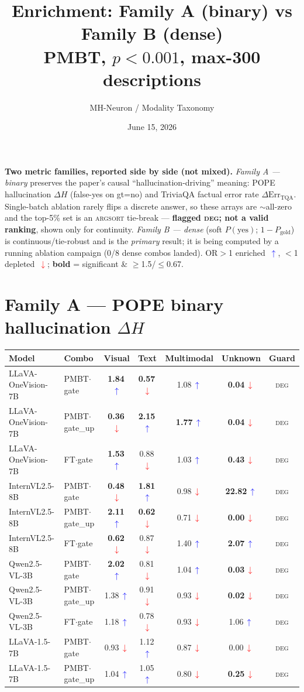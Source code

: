 \documentclass[11pt,a4paper]{article}
\title{Enrichment: Family A (binary) vs Family B (dense)\\[0.3em]
\large PMBT, $p<0.001$, max-300 descriptions}
\author{MH-Neuron / Modality Taxonomy}\date{June 15, 2026}
\newcommand{\up}{\,\textcolor{blue}{$\uparrow$}}\newcommand{\dn}{\,\textcolor{red}{$\downarrow$}}
\begin{document}
\maketitle

\noindent\textbf{Two metric families, reported side by side (not mixed).}
\emph{Family A — binary} preserves the paper's causal ``hallucination-driving''
meaning: POPE hallucination $\Delta H$ (false-yes on gt=no) and TriviaQA factual
error rate $\Delta\mathrm{Err}_{\mathrm{TQA}}$. Single-batch ablation rarely flips
a discrete answer, so these arrays are $\sim$all-zero and the top-5\% set is an
\textsc{argsort} tie-break --- \textbf{flagged \textsc{deg}; not a valid ranking},
shown only for continuity. \emph{Family B — dense} (soft $P(\text{yes})$;
$1-P_{\text{gold}}$) is continuous/tie-robust and is the \emph{primary} result;
it is being computed by a running ablation campaign (0/8 dense combos landed).
OR$>$1 enriched \up, $<$1 depleted \dn; \textbf{bold} = significant \& $\ge$1.5/$\le$0.67.

\section*{Family A --- POPE binary hallucination $\Delta H$}
\begin{center}\small\begin{tabular}{l l c c c c c}
\toprule Model & Combo & Visual & Text & Multimodal & Unknown & Guard \\ \midrule
LLaVA-OneVision-7B & PMBT$\cdot$gate & \textbf{1.84\up} & \textbf{0.57\dn} & 1.08\up & \textbf{0.04\dn} & \textsc{deg} \\
LLaVA-OneVision-7B & PMBT$\cdot$gate\_up & \textbf{0.36\dn} & \textbf{2.15\up} & \textbf{1.77\up} & \textbf{0.04\dn} & \textsc{deg} \\
LLaVA-OneVision-7B & FT$\cdot$gate & \textbf{1.53\up} & 0.88\dn & 1.03\up & \textbf{0.43\dn} & \textsc{deg} \\
InternVL2.5-8B & PMBT$\cdot$gate & \textbf{0.48\dn} & \textbf{1.81\up} & 0.98\dn & \textbf{22.82\up} & \textsc{deg} \\
InternVL2.5-8B & PMBT$\cdot$gate\_up & \textbf{2.11\up} & \textbf{0.62\dn} & 0.71\dn & \textbf{0.00\dn} & \textsc{deg} \\
InternVL2.5-8B & FT$\cdot$gate & \textbf{0.62\dn} & 0.87\dn & 1.40\up & \textbf{2.07\up} & \textsc{deg} \\
Qwen2.5-VL-3B & PMBT$\cdot$gate & \textbf{2.02\up} & 0.81\dn & 1.04\up & \textbf{0.03\dn} & \textsc{deg} \\
Qwen2.5-VL-3B & PMBT$\cdot$gate\_up & 1.38\up & 0.91\dn & 0.93\dn & \textbf{0.02\dn} & \textsc{deg} \\
Qwen2.5-VL-3B & FT$\cdot$gate & 1.18\up & 0.78\dn & 0.93\dn & 1.06\up & \textsc{deg} \\
LLaVA-1.5-7B & PMBT$\cdot$gate & 0.93\dn & 1.12\up & 0.87\dn & 0.00\dn & \textsc{deg} \\
LLaVA-1.5-7B & PMBT$\cdot$gate\_up & 1.04\up & 1.05\up & 0.80\dn & \textbf{0.25\dn} & \textsc{deg} \\
\bottomrule\end{tabular}\end{center}
\end{document}

